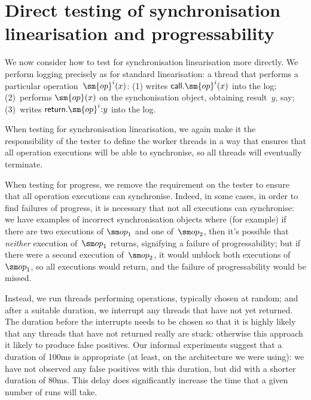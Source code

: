 \section{Direct testing of synchronisation linearisation and progressability}
\label{sec:direct}

We now consider how to test for synchronisation linearisation more directly.
We perform logging precisely as for standard linearisation: a thread that
performs a particular operation~$\sm{op}^i(x)$: (1) writes
$\call.\sm{op}^i(x)$ into the log; (2)~performs $\sm{op}(x)$ on the
synchonisation object, obtaining result~$y$, say; (3)~writes
$\return.\sm{op}^i \:: y$ into the log.  

When testing for synchronisation linearisation, we again make it the
responsibility of the tester to define the worker threads in a way that
ensures that all operation executions will be able to synchronise, so all
threads will eventually terminate. 

When testing for progress, we remove the requirement on the tester to ensure
that all operation executions can synchronise.  Indeed, in some cases, in
order to find failures of progress, it is necessary that not all executions
can synchronise: we have examples of incorrect synchronisation objects where
(for example) if there are two executions of $\op_1$ and one of~$\op_2$, then
it's possible that \emph{neither} execution of~$\op_1$ returns, signifying
a failure of progressability; but if there were a second execution
of~$\op_2$, it would unblock both executions of~$\op_1$, so all executions
would return, and the failure of progressability would be missed.

Instead, we run threads performing operations, typically chosen at random; and
after a suitable duration, we interrupt any threads that have not yet
returned.  The duration before the interrupts needs to be chosen so that it is
highly likely that any threads that have not returned really are stuck:
otherwise this approach it likely to produce false positives.  Our informal
experiments suggest that a duration of 100ms is appropriate (at least, on the
architecture we were using): we have not observed any false positives with
this duration, but did with a shorter duration of 80ms.  This delay does
significantly increase the time that a given number of runs will take.


